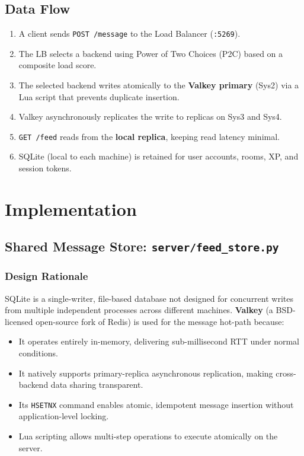\documentclass[12pt,a4paper]{article}
\begin{document}
\subsection{Data Flow}

\begin{enumerate}
    \item A client sends \texttt{POST /message} to the Load Balancer (\texttt{:5269}).
    \item The LB selects a backend using Power of Two Choices (P2C) based on a composite load score.
    \item The selected backend writes atomically to the \textbf{Valkey primary} (Sys2) via a Lua script that prevents duplicate insertion.
    \item Valkey asynchronously replicates the write to replicas on Sys3 and Sys4.
    \item \texttt{GET /feed} reads from the \textbf{local replica}, keeping read latency minimal.
    \item SQLite (local to each machine) is retained for user accounts, rooms, XP, and session tokens.
\end{enumerate}

\section{Implementation}

\subsection{Shared Message Store: \texttt{server/feed\_store.py}}

\subsubsection{Design Rationale}

SQLite is a single-writer, file-based database not designed for concurrent writes from multiple independent processes across different machines. \textbf{Valkey} (a BSD-licensed open-source fork of Redis) is used for the message hot-path because:
\begin{itemize}
    \item It operates entirely in-memory, delivering sub-millisecond RTT under normal conditions.
    \item It natively supports primary-replica asynchronous replication, making cross-backend data sharing transparent.
    \item Its \texttt{HSETNX} command enables atomic, idempotent message insertion without application-level locking.
    \item Lua scripting allows multi-step operations to execute atomically on the server.
\end{itemize}
\end{document}
